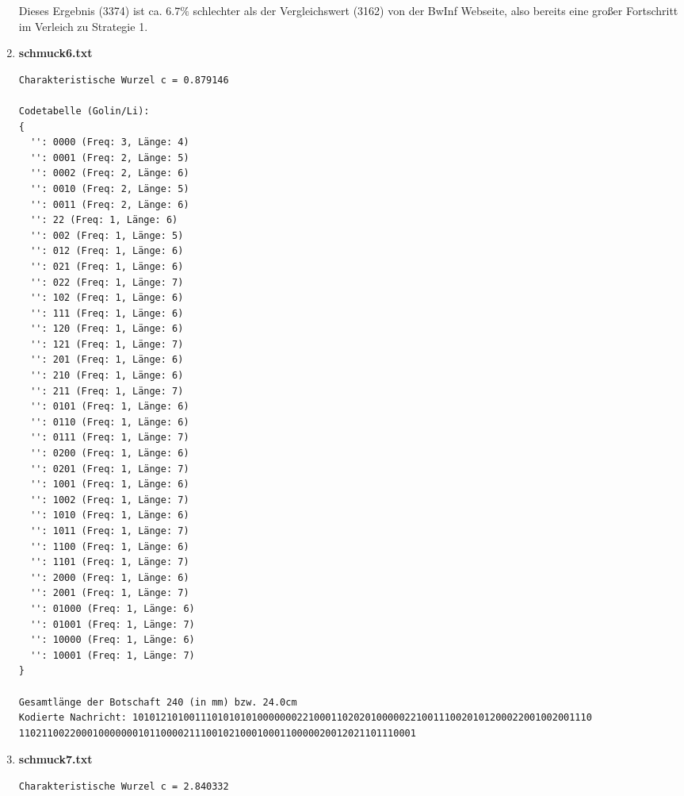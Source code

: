 \documentclass[a4paper,10pt,ngerman]{scrartcl}
\begin{document}
\begin{enumerate}
Dieses Ergebnis (3374) ist ca. $6.7\%$ schlechter als der Vergleichswert (3162) von der BwInf Webseite, also bereits eine großer Fortschritt im Verleich zu Strategie 1.
  \item \textbf{schmuck6.txt}
\begin{verbatim}
Charakteristische Wurzel c = 0.879146

Codetabelle (Golin/Li):
{
  '': 0000 (Freq: 3, Länge: 4)
  '': 0001 (Freq: 2, Länge: 5)
  '': 0002 (Freq: 2, Länge: 6)
  '': 0010 (Freq: 2, Länge: 5)
  '': 0011 (Freq: 2, Länge: 6)
  '': 22 (Freq: 1, Länge: 6)
  '': 002 (Freq: 1, Länge: 5)
  '': 012 (Freq: 1, Länge: 6)
  '': 021 (Freq: 1, Länge: 6)
  '': 022 (Freq: 1, Länge: 7)
  '': 102 (Freq: 1, Länge: 6)
  '': 111 (Freq: 1, Länge: 6)
  '': 120 (Freq: 1, Länge: 6)
  '': 121 (Freq: 1, Länge: 7)
  '': 201 (Freq: 1, Länge: 6)
  '': 210 (Freq: 1, Länge: 6)
  '': 211 (Freq: 1, Länge: 7)
  '': 0101 (Freq: 1, Länge: 6)
  '': 0110 (Freq: 1, Länge: 6)
  '': 0111 (Freq: 1, Länge: 7)
  '': 0200 (Freq: 1, Länge: 6)
  '': 0201 (Freq: 1, Länge: 7)
  '': 1001 (Freq: 1, Länge: 6)
  '': 1002 (Freq: 1, Länge: 7)
  '': 1010 (Freq: 1, Länge: 6)
  '': 1011 (Freq: 1, Länge: 7)
  '': 1100 (Freq: 1, Länge: 6)
  '': 1101 (Freq: 1, Länge: 7)
  '': 2000 (Freq: 1, Länge: 6)
  '': 2001 (Freq: 1, Länge: 7)
  '': 01000 (Freq: 1, Länge: 6)
  '': 01001 (Freq: 1, Länge: 7)
  '': 10000 (Freq: 1, Länge: 6)
  '': 10001 (Freq: 1, Länge: 7)
}

Gesamtlänge der Botschaft 240 (in mm) bzw. 24.0cm
Kodierte Nachricht: 101012101001110101010100000002210001102020100000221001110020101200022001002001110
1102110022000100000001011000021110010210001000110000020012021101110001
\end{verbatim}
  \item \textbf{schmuck7.txt}
\begin{verbatim}
Charakteristische Wurzel c = 2.840332


\end{verbatim}
\end{enumerate}
\end{document}
